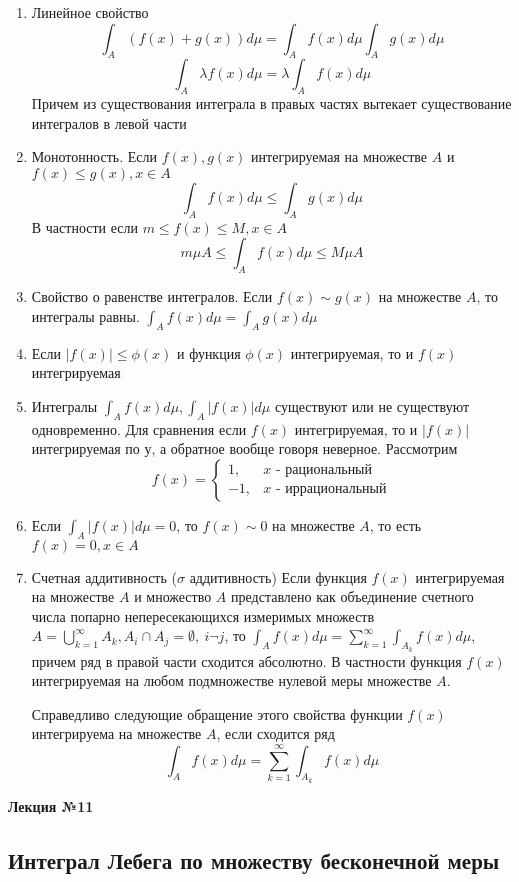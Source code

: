 \documentclass[14pt,a4paper]{extarticle}
\theoremstyle{definition}
\theoremstyle{remark}
\renewcommand{\[}{\begin{dmath*}[compact]}
\renewcommand{\]}{\end{dmath*}}
\newcommand{\be}{\begin{enumerate}}
\newcommand{\ee}{\end{enumerate}}
\newcommand{\sep}{ , \ \allowbreak }
\begin{document}
\be
  \item Линейное свойство
  \[\int_A (f(x)+g(x))d\mu=\int_A f(x)d\mu \int_A g(x)d\mu \]
  \[\int_A \lambda f(x) d\mu = \lambda \int_A f(x) d \mu\]
  Причем из существования интеграла в правых частях вытекает существование интегралов в левой части
  \item Монотонность. Если $f(x), g(x)$ интегрируемая на множестве $A$ и $f(x)\leq g(x), x\in A$
  \[\int_A f(x) d\mu \leq \int_A g(x) d\mu\]
  В частности если  $m\leq f(x) \leq M, x \in A$
  \[ m\mu A\leq \int_A f(x) d \mu \leq M\mu A \]
  \item Свойство о равенстве интегралов.
  Если $f(x) \sim g(x)$ на множестве $A$, то интегралы равны. $\int_A f(x)d\mu = \int_A g(x) d\mu$
  \item Если $|f(x)|\leq \phi(x)$ и функция $\phi(x)$ интегрируемая, то и $f(x)$ интегрируемая
  \item Интегралы $\int_A f(x) d\mu, \int_A |f(x)| d\mu$ существуют или не существуют одновременно. Для сравнения если $f(x)$ интегрируемая, то и $|f(x)|$ интегрируемая по у, а обратное вообще говоря неверное. Рассмотрим
  \[f(x) = \begin{cases} 1, & x\text{ - рациональный} \\ -1, & x\text{ - иррациональный} \end{cases}\]
  \item Если $\int_A |f(x)| d\mu = 0$, то $f(x)\sim 0$ на множестве $A$, то есть $f(x) = 0, x \in A$
  \item Счетная аддитивность ($\sigma$ аддитивность)
  Если функция $f(x)$ интегрируемая на множестве $A$ и множество $A$ представлено как объединение счетного числа попарно непересекающихся измеримых множеств $A= \bigcup_{k=1}^\infty A_k, A_i \cap A_j=\emptyset \sep i \neg j$, то $\int_A f(x)d\mu = \sum_{k=1}^\infty \int_{A_k} f(x) d \mu$, причем ряд в правой части сходится абсолютно. В частности функция $f(x)$ интегрируемая на любом подмножестве нулевой меры множестве $A$.

  Справедливо следующие обращение этого свойства функции $f(x)$ интегрируема на множестве $A$, если сходится ряд
  \[\int_A f(x) d \mu =\sum_{k=1}^\infty \int_{A_k} f(x) d \mu\]
\ee

\textbf{Лекция №11}

\subsection{Интеграл Лебега по множеству бесконечной меры}
\end{document}
